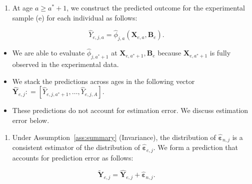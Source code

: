 \documentclass[static]{JJH-Beamer}
\begin{document}
\begin{frame}

\begin{enumerate}[2.]
\item At age $a \geq a^*+1$, we construct the predicted outcome for the experimental sample (e) for each individual as follows:
\end{enumerate}

\begin{equation}
\hat{Y}_{e,j,a} = \hat{\phi}_{j,a} \left( \bm{X}_{e,a}, \bm{B}_e \right).
\end{equation}

\begin{itemize}
\item We are able to evaluate $\hat{\phi}_{j,a^*+1}$ at $ \bm{X}_{e,a^*+1}, \bm{B}_e $ because $\bm{X}_{e,a^*+1}$ is fully observed in the experimental data.
\item We stack the predictions across ages in the following vector $\hat{\bm{Y}}_{e,j} : = \left[ \hat{Y}_{e,j,a^*+1}, \ldots,  \hat{Y}_{e,j,A} \right]$.
\item These predictions do not account for estimation error. We discuss estimation error below.
\end{itemize}

\end{frame}

\begin{frame}

\begin{enumerate}[3.]
\item Under Assumption~\ref{ass:summary} (Invariance), the distribution of $\hat{\bm{\varepsilon}}_{n,j}$ is a consistent estimator of the distribution of $\hat{\bm{\varepsilon}}_{e,j}$. We form a prediction that accounts for prediction error as follows:
\end{enumerate}

\begin{equation}
\tilde{\bm{Y}}_{e,j} = \hat{\bm{Y}}_{e,j} + \hat{\bm{\varepsilon}}_{n,j}.
\end{equation}

\end{frame}
\end{document}

